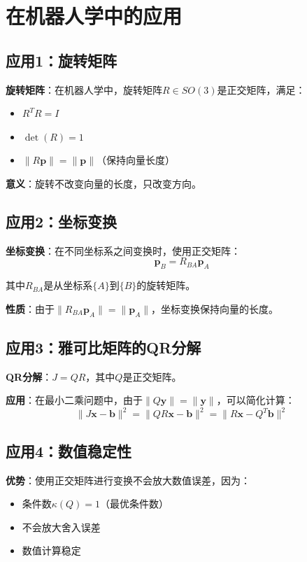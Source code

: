 \documentclass[12pt,a4paper]{article}
\begin{document}
\section{在机器人学中的应用}

\subsection{应用1：旋转矩阵}

\textbf{旋转矩阵}：在机器人学中，旋转矩阵$R \in SO(3)$是正交矩阵，满足：
\begin{itemize}
\item $R^T R = I$
\item $\det(R) = 1$
\item $\|R\bm{p}\| = \|\bm{p}\|$（保持向量长度）
\end{itemize}

\textbf{意义}：旋转不改变向量的长度，只改变方向。

\subsection{应用2：坐标变换}

\textbf{坐标变换}：在不同坐标系之间变换时，使用正交矩阵：
\begin{equation}
\bm{p}_B = R_{BA} \bm{p}_A
\end{equation}

其中$R_{BA}$是从坐标系$\{A\}$到$\{B\}$的旋转矩阵。

\textbf{性质}：由于$\|R_{BA}\bm{p}_A\| = \|\bm{p}_A\|$，坐标变换保持向量的长度。

\subsection{应用3：雅可比矩阵的QR分解}

\textbf{QR分解}：$J = QR$，其中$Q$是正交矩阵。

\textbf{应用}：在最小二乘问题中，由于$\|Q\bm{y}\| = \|\bm{y}\|$，可以简化计算：
\begin{equation}
\|J\bm{x} - \bm{b}\|^2 = \|QR\bm{x} - \bm{b}\|^2 = \|R\bm{x} - Q^T\bm{b}\|^2
\end{equation}

\subsection{应用4：数值稳定性}

\textbf{优势}：使用正交矩阵进行变换不会放大数值误差，因为：
\begin{itemize}
\item 条件数$\kappa(Q) = 1$（最优条件数）
\item 不会放大舍入误差
\item 数值计算稳定
\end{itemize}
\end{document}
